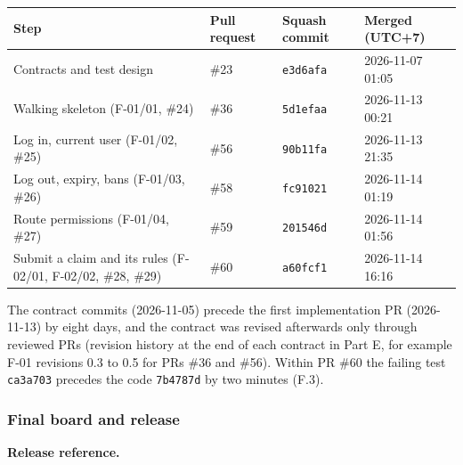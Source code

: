 \begin{center}\small
\begin{tabular}{@{}llll@{}}
\toprule \textbf{Step} & \textbf{Pull request} & \textbf{Squash commit} & \textbf{Merged (UTC+7)} \\ \midrule
Contracts and test design & \#23 & \texttt{e3d6afa} & 2026-11-07 01:05 \\
Walking skeleton (F-01/01, \#24) & \#36 & \texttt{5d1efaa} & 2026-11-13 00:21 \\
Log in, current user (F-01/02, \#25) & \#56 & \texttt{90b11fa} & 2026-11-13 21:35 \\
Log out, expiry, bans (F-01/03, \#26) & \#58 & \texttt{fc91021} & 2026-11-14 01:19 \\
Route permissions (F-01/04, \#27) & \#59 & \texttt{201546d} & 2026-11-14 01:56 \\
Submit a claim and its rules (F-02/01, F-02/02, \#28, \#29) & \#60 & \texttt{a60fcf1} & 2026-11-14 16:16 \\
\bottomrule
\end{tabular}
\end{center}

The contract commits (2026-11-05) precede the first implementation PR (2026-11-13) by eight days, and the contract was revised afterwards only through reviewed PRs (revision history at the end of each contract in Part E, for example F-01 revisions 0.3 to 0.5 for PRs \#36 and \#56).
Within PR \#60 the failing test \texttt{ca3a703} precedes the code \texttt{7b4787d} by two minutes (F.3).

\subsubsection*{Final board and release}


\textbf{Release reference.} 
